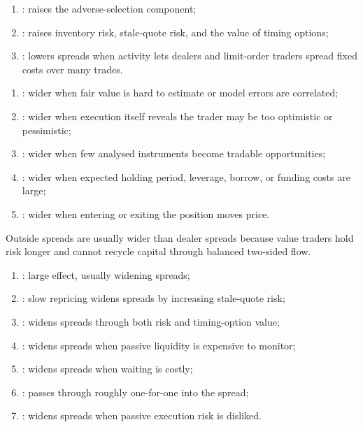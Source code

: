 \begin{taxonomy} 
\begin{enumerate}[label=\roman*.]
\setlength{\itemsep}{0pt}
\item {}: raises the adverse-selection component;
\item {}: raises inventory risk, stale-quote risk, and the value of timing options;
\item {}: lowers spreads when activity lets dealers and limit-order traders spread fixed costs over many trades.
\end{enumerate}
\end{taxonomy}

\begin{taxonomy} 
\begin{enumerate}[label=\roman*.]
\setlength{\itemsep}{0pt}
\item {}: wider when fair value is hard to estimate or model errors are correlated;
\item {}: wider when execution itself reveals the trader may be too optimistic or pessimistic;
\item {}: wider when few analysed instruments become tradable opportunities;
\item {}: wider when expected holding period, leverage, borrow, or funding costs are large;
\item {}: wider when entering or exiting the position moves price.
\end{enumerate}
Outside spreads are usually wider than dealer spreads because value traders hold risk longer and cannot recycle capital through balanced two-sided flow.
\end{taxonomy}

\begin{taxonomy} 
\begin{enumerate}[label=\roman*.]
\setlength{\itemsep}{0pt}
\item {}: large effect, usually widening spreads;
\item {}: slow repricing widens spreads by increasing stale-quote risk;
\item {}: widens spreads through both risk and timing-option value;
\item {}: widens spreads when passive liquidity is expensive to monitor;
\item {}: widens spreads when waiting is costly;
\item {}: passes through roughly one-for-one into the spread;
\item {}: widens spreads when passive execution risk is disliked.
\end{enumerate}
\end{taxonomy}

